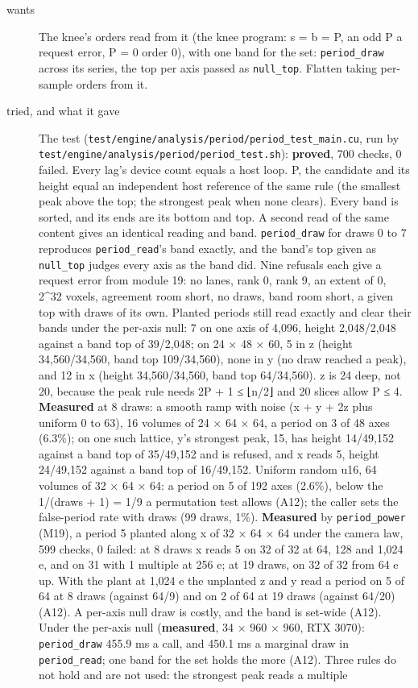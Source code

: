 \begin{description}
\item[{wants}] The knee's orders read from it (the knee program: s = b = P, an odd P a request error, P = 0 order 0), with one band for the set: \texttt{period\_\allowbreak{}draw} across its series, the top per axis passed as \texttt{null\_\allowbreak{}top}. Flatten taking per-sample orders from it.
\item[{tried, and what it gave}] The test (\texttt{test/\allowbreak{}engine/\allowbreak{}analysis/\allowbreak{}period/\allowbreak{}period\_\allowbreak{}test\_\allowbreak{}main.\allowbreak{}cu}, run by \texttt{test/\allowbreak{}engine/\allowbreak{}analysis/\allowbreak{}period/\allowbreak{}period\_\allowbreak{}test.\allowbreak{}sh}): \textbf{proved}, 700 checks, 0 failed. Every lag's device count equals a host loop. P, the candidate and its height equal an independent host reference of the same rule (the smallest peak above the top; the strongest peak when none clears). Every band is sorted, and its ends are its bottom and top. A second read of the same content gives an identical reading and band. \texttt{period\_\allowbreak{}draw} for draws 0 to 7 reproduces \texttt{period\_\allowbreak{}read}'s band exactly, and the band's top given as \texttt{null\_\allowbreak{}top} judges every axis as the band did. Nine refusals each give a request error from module 19: no lanes, rank 0, rank 9, an extent of 0, 2\textasciicircum{}32 voxels, agreement room short, no draws, band room short, a given top with draws of its own. Planted periods still read exactly and clear their bands under the per-axis null: 7 on one axis of 4,096, height 2,048/2,048 against a band top of 39/2,048; on 24 × 48 × 60, 5 in z (height 34,560/34,560, band top 109/34,560), none in y (no draw reached a peak), and 12 in x (height 34,560/34,560, band top 64/34,560). z is 24 deep, not 20, because the peak rule needs 2P + 1 ≤ ⌊n/2⌋ and 20 slices allow P ≤ 4. \textbf{Measured} at 8 draws: a smooth ramp with noise (x + y + 2z plus uniform 0 to 63), 16 volumes of 24 × 64 × 64, a period on 3 of 48 axes (6.3\%); on one such lattice, y's strongest peak, 15, has height 14/49,152 against a band top of 35/49,152 and is refused, and x reads 5, height 24/49,152 against a band top of 16/49,152. Uniform random u16, 64 volumes of 32 × 64 × 64: a period on 5 of 192 axes (2.6\%), below the 1/(draws + 1) = 1/9 a permutation test allows (A12); the caller sets the false-period rate with draws (99 draws, 1\%). \textbf{Measured} by \texttt{period\_\allowbreak{}power} (M19), a period 5 planted along x of 32 × 64 × 64 under the camera law, 599 checks, 0 failed: at 8 draws x reads 5 on 32 of 32 at 64, 128 and 1,024 e, and on 31 with 1 multiple at 256 e; at 19 draws, on 32 of 32 from 64 e up. With the plant at 1,024 e the unplanted z and y read a period on 5 of 64 at 8 draws (against 64/9) and on 2 of 64 at 19 draws (against 64/20) (A12). A per-axis null draw is costly, and the band is set-wide (A12). Under the per-axis null (\textbf{measured}, 34 × 960 × 960, RTX 3070): \texttt{period\_\allowbreak{}draw} 455.9 ms a call, and 450.1 ms a marginal draw in \texttt{period\_\allowbreak{}read}; one band for the set holds the more (A12). Three rules do not hold and are not used: the strongest peak reads a multiple 
\end{description}
